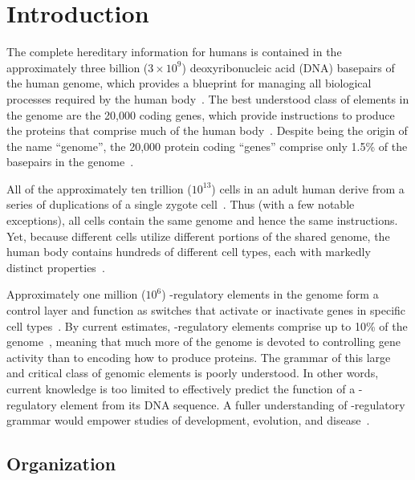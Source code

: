\chapter{Introduction}
\label{chap:intro}
%

The complete hereditary information for humans is contained in the approximately three billion (\begin{math}3\times10^9\end{math})
deoxyribonucleic acid (DNA) basepairs of the human genome, which provides a blueprint for managing all biological processes
required by the human body~\citep{Lander2001}.  The best understood class of elements in the genome are the 20,000 coding genes, which provide instructions
to produce the proteins that comprise much of the human body~\citep{Clamp2007}.  Despite being the origin of the name ``genome'', the 20,000 protein
coding ``genes'' comprise only 1.5\% of the basepairs in the genome~\citep{Hsu2006}.
%

All of the approximately ten trillion (\begin{math}10^{13}\end{math}) cells in an adult human derive from a series of duplications of
a single zygote cell~\citep{Alberts2002}.  Thus (with a few notable exceptions), all cells contain the same genome and hence the same instructions.  Yet,
because different cells utilize different portions of the shared genome, the human body contains hundreds of different cell types, each with
markedly distinct properties~\citep{Alberts2002}.
%

Approximately one million (\begin{math}10^6\end{math}) \cis-regulatory elements in the genome form
a control layer and function as switches that activate or inactivate genes in specific cell types~\citep{Maston2006}.  By current estimates, \cis-regulatory
elements comprise up to 10\% of the genome~\citep{Garber2009}, meaning that much more of the genome is devoted to controlling gene
activity than to encoding how to produce proteins.  The grammar of this large and critical class of genomic elements is poorly understood.
In other words, current knowledge is too limited to effectively predict the function of a \cis-regulatory element from its DNA sequence.
A fuller understanding of \cis-regulatory grammar would empower studies of development, evolution, and disease~\citep{Davidson2006}.
%

\section{Organization}
%

